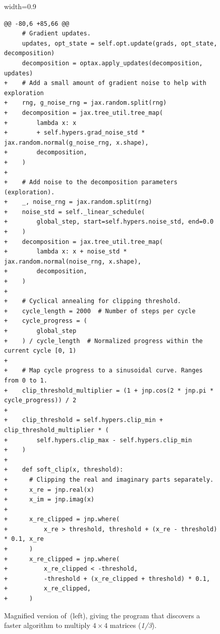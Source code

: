 \documentclass[logo,copyright,12pt]{googledeepmind}
\theoremstyle{definition}
\theoremstyle{remark}
\theoremstyle{plain}
\begin{document}
\begin{figure}[p]
\begin{adjustbox}{width=0.9\textwidth}
\begin{minipage}{0.9\textwidth}
\begin{lstlisting}[style=pydiff, backgroundcolor=\color{backcolour}]
@@ -80,6 +85,66 @@
     # Gradient updates.
     updates, opt_state = self.opt.update(grads, opt_state, decomposition)
     decomposition = optax.apply_updates(decomposition, updates)
+    # Add a small amount of gradient noise to help with exploration
+    rng, g_noise_rng = jax.random.split(rng)
+    decomposition = jax.tree_util.tree_map(
+        lambda x: x
+        + self.hypers.grad_noise_std * jax.random.normal(g_noise_rng, x.shape),
+        decomposition,
+    )
+
+    # Add noise to the decomposition parameters (exploration).
+    _, noise_rng = jax.random.split(rng)
+    noise_std = self._linear_schedule(
+        global_step, start=self.hypers.noise_std, end=0.0
+    )
+    decomposition = jax.tree_util.tree_map(
+        lambda x: x + noise_std * jax.random.normal(noise_rng, x.shape),
+        decomposition,
+    )
+
+    # Cyclical annealing for clipping threshold.
+    cycle_length = 2000  # Number of steps per cycle
+    cycle_progress = (
+        global_step 
+    ) / cycle_length  # Normalized progress within the current cycle [0, 1)
+
+    # Map cycle progress to a sinusoidal curve. Ranges from 0 to 1.
+    clip_threshold_multiplier = (1 + jnp.cos(2 * jnp.pi * cycle_progress)) / 2
+
+    clip_threshold = self.hypers.clip_min + clip_threshold_multiplier * (
+        self.hypers.clip_max - self.hypers.clip_min
+    )
+
+    def soft_clip(x, threshold):
+      # Clipping the real and imaginary parts separately.
+      x_re = jnp.real(x)
+      x_im = jnp.imag(x)
+
+      x_re_clipped = jnp.where(
+          x_re > threshold, threshold + (x_re - threshold) * 0.1, x_re
+      )
+      x_re_clipped = jnp.where(
+          x_re_clipped < -threshold,
+          -threshold + (x_re_clipped + threshold) * 0.1,
+          x_re_clipped,
+      )
\end{lstlisting}
\end{minipage}
\end{adjustbox}
\caption{
Magnified version of~(left), giving the program that discovers a faster algorithm to multiply $4\times4$ matrices (\emph{1/3}).}\label{fig:relaxed-opt-diff-appendix-1}
\centering
\end{figure}
\addtocounter{figure}{-1}
\end{document}
